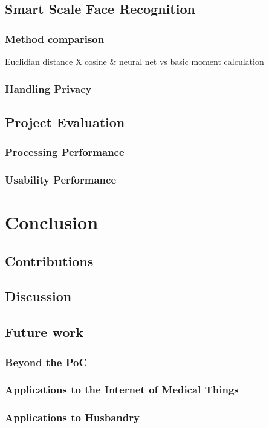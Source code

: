 \documentclass[
12pt,        %
openright,   %
twoside,     %
a4paper,     %
brazil,       %
english       %
%
%
]{ppgca}
\begin{document}
\section{Smart Scale Face Recognition}
\subsection{Method comparison}
Euclidian distance X cosine \& neural net vs basic moment calculation
\subsection{Handling Privacy}
\section{Project Evaluation}
\subsection{Processing Performance}
\subsection{Usability Performance}


\chapter{Conclusion}
\section{Contributions}
\section{Discussion}
\section{Future work}
\subsection{Beyond the PoC}
\subsection{Applications to the Internet of Medical Things}
\subsection{Applications to Husbandry}
\end{document}
